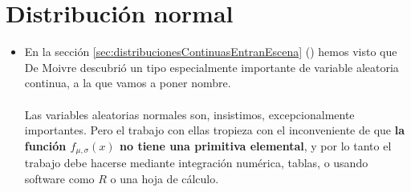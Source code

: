 \subsection*{}



\section{Distribución normal}

\begin{itemize}

\item En la sección \ref{sec:distribucionesContinuasEntranEscena} (\pageref{sec:distribucionesContinuasEntranEscena}) hemos visto que De Moivre descubrió un tipo especialmente importante de variable aleatoria continua, a la que vamos a poner nombre.\\[3mm]
       \\[3mm]
       Las variables aleatorias normales son, insistimos, excepcionalmente importantes. Pero el trabajo con ellas tropieza con el inconveniente de que {\bf la función $f_{\mu,\sigma}(x)$ no tiene una primitiva elemental}, y por lo tanto el trabajo debe hacerse mediante integración numérica, tablas, o usando software como $R$ o una hoja de cálculo.



\end{itemize}
